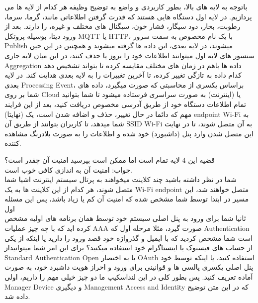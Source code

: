 \documentclass[10pt, a4paper]{article}
\begin{document}
باتوجه به لایه های بالا، بطور کاربردی و واضع به توضیح وظیفه هر کدام از لایه ها می پردازیم. در لایه اول دستگاه هایی هستند که قدرت گرفتن اطلاعاتی مانند، گرما، سرما، رطوبت، بخار، دود سیگار، فشار خون، سیگنال های مختلف و غیره، را دارند. بعد از ورود دیتا، بوسیله پروتکل MQTT یا HTTP، با یک نام مخصوص به سمت سرور Publish میشوند، در لایه بعدی، این داده ها گرفته میشوند و همچنین در این حین سنسور های لایه اول میتوانند اطلاعات خود را بروز یا حذف کنند، در این میان لایه جاری Aggregation داده ها باهم در زمان های مختلف مقایسه کرده تا بتواند تشخیص دهد کدام داده به تازگی تغییر کرده، تا آخرین تغییرات را به لایه بعدی هدایت کند. در لایه بعدی Processing Event، براساس یکسری از محاسبتی که صورت میگیرد، داده های شما بر روی Cloud یا (اینترنت) به صورت سراسری فرستاده میشود تا شما بتوانید تمام اطلاعات دستگاه خود از طریق آدرسی مخصوص دریافت کنید، بعد از این فرایند مهم که دائما در حال تغییر، حذف و اضافه شدن است، یک (نهایتا) endpoint Wi-Fi به شما میدهد، تا کاربران بتوانند از طریق آن SSID Wi-Fi به آن متصل شوند، تا در نهایت این متصل شدن وارد پنل (داشبورد) خود شده و اطلاعات را به صورت بلادرنگ 
مشاهده کننده.

قضیه این 4 لایه تمام است اما ممکن است بپرسید امنیت آن چقدر است؟\\
جواب: امنیت آن به اندازی کافی خوب است.\\

شما در نظر داشته باشید چند کلاینت میخواهند به پرتال سیستم اینترنت اشیا شما متصل شوند، هر کدام از این کلاینت ها به یک Wi-Fi endpoint متصل خواهند شد، این مسیر در ابتدا توسط شما مشخص شده که امنیت آن کم یا زیاد
 باشد، پس این مسئله اول\\
 
 ثانیا شما برای ورود به پنل اصلی سیستم خود توسط همان برنامه های اولیه مشخص کرده اید که با چه چیز عملیات AAA صورت گیرد، مثلا مرحله اول که Authentication است شما مشخص کردید که با ایمیل و گذرواژه خود قصد ورود را دارید یا اینکه از یکی از حساب های فیسبوک یا اینستاگرام خود استفاده میکنید؟ برای این امر شما میتوانیداز Standard Authentication Open
یا به اختصار OAuth استفاده کنید، یا اینکه توسط خود پنل اصلی یکسری پالسی ها و قوانینی برای ورود و احراز هویت داشبرد خود، به صورت آماده تعریف کنید. پس بطور کلی در این لنداسکیپ ما دو چیز خیلی مهم را داریم، اولی 
Manager Device
و دیگیری
Management Access and Identity
که در این متن توضیح داده شد.
\end{document}
